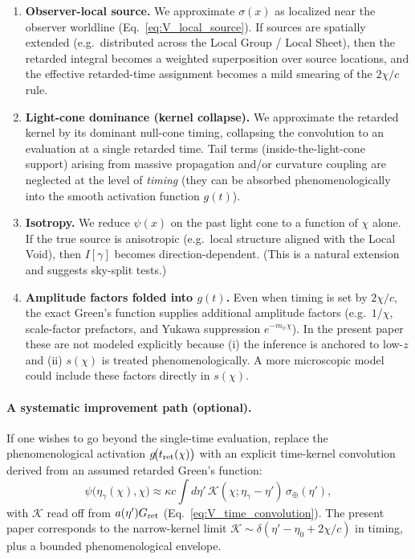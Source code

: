 \documentclass[10pt]{article}
\newcommand{\chis}{\chi}
\begin{document}
\begin{enumerate}[leftmargin=1.2em]
\item \textbf{Observer-local source.}
We approximate $\sigma(x)$ as localized near the observer worldline (Eq.~\eqref{eq:V_local_source}).
If sources are spatially extended (e.g.\ distributed across the Local Group / Local Sheet), then
the retarded integral becomes a weighted superposition over source locations, and the effective
retarded-time assignment becomes a mild smearing of the $2\chis/c$ rule.

\item \textbf{Light-cone dominance (kernel collapse).}
We approximate the retarded kernel by its dominant null-cone timing, collapsing the convolution to
an evaluation at a single retarded time. Tail terms (inside-the-light-cone support) arising from
massive propagation and/or curvature coupling are neglected at the level of \emph{timing} (they can
be absorbed phenomenologically into the smooth activation function $g(t)$).

\item \textbf{Isotropy.}
We reduce $\psi(x)$ on the past light cone to a function of $\chis$ alone. If the true source is
anisotropic (e.g.\ local structure aligned with the Local Void), then $I[\gamma]$ becomes
direction-dependent. (This is a natural extension and suggests sky-split tests.)

\item \textbf{Amplitude factors folded into $g(t)$.}
Even when timing is set by $2\chis/c$, the exact Green’s function supplies additional amplitude
factors (e.g.\ $1/\chis$, scale-factor prefactors, and Yukawa suppression $e^{-m_\psi \chis}$).
In the present paper these are not modeled explicitly because (i) the inference is anchored to
low-$z$ and (ii) $s(\chis)$ is treated phenomenologically. A more microscopic model could include
these factors directly in $s(\chis)$.
\end{enumerate}

\paragraph{A systematic improvement path (optional).}
If one wishes to go beyond the single-time evaluation, replace the phenomenological activation
$g\!\bigl(t_{\rm ret}(\chis)\bigr)$ with an explicit time-kernel convolution derived from an
assumed retarded Green’s function:
\begin{equation}
\psi\bigl(\eta_{\gamma}(\chis),\chis\bigr)
\approx
\kappa c\int d\eta'\,\mathcal{K}(\chis;\eta_{\gamma}-\eta')\,\sigma_\oplus(\eta'),
\label{eq:V_kernel_general}
\end{equation}
with $\mathcal{K}$ read off from $a(\eta')G_{\rm ret}$ (Eq.~\eqref{eq:V_time_convolution}). The
present paper corresponds to the narrow-kernel limit
$\mathcal{K}\sim \delta(\eta'-\eta_0+2\chis/c)$ in timing, plus a bounded phenomenological envelope.
\end{document}
